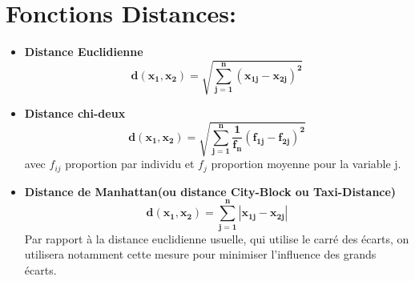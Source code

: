 \documentclass[french]{article}
\begin{document}
	\section{Fonctions Distances: }
	\begin{itemize}[label=\textbullet, font=\LARGE \color{red}]
		\item \textbf{Distance Euclidienne}
		$$\bm{d(x_{1},x_{2})=\sqrt{\sum_{j=1}^{n}(x_{1j}-x_{2j})^{2}}}$$
		
		\item \textbf{Distance chi-deux}
		$$\bm{d(x_{1},x_{2})=\sqrt{\sum_{j=1}^{n}\frac{1}{f_{n}}(f_{1j}-f_{2j})^{2}}}$$
		avec $f_{ij}$ proportion par individu et $f_{j}$ proportion moyenne pour la variable j.
		
		\item \textbf{Distance de Manhattan(ou distance City-Block ou Taxi-Distance)}
		$$\bm{d(x_{1},x_{2})=\sum_{j=1}^{n}|x_{1j}-x_{2j}|}$$
		Par rapport à la distance euclidienne usuelle, qui utilise le carré des écarts, on utilisera
		notamment cette mesure pour minimiser l’influence des grands écarts.
	\end{itemize}
	
\end{document}
